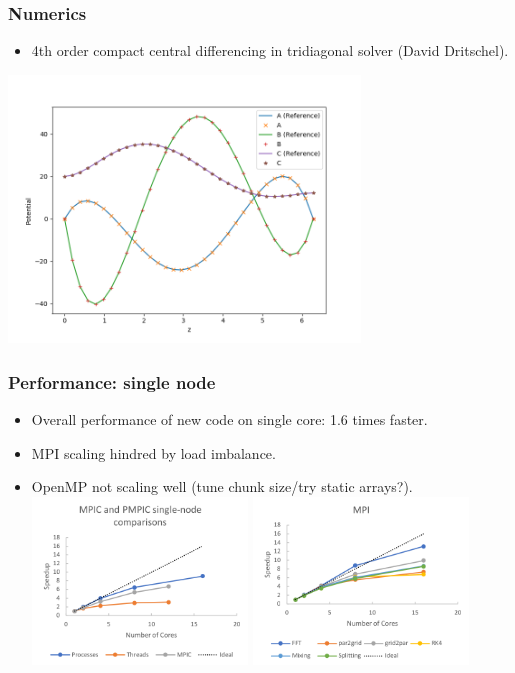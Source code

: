 \documentclass{beamer}
\begin{document}
\begin{frame}
\frametitle{Numerics}
\begin{itemize}
\item 4th order compact central differencing in tridiagonal solver (David Dritschel).
\end{itemize}

\includegraphics[width=0.70\textwidth]{pmpic_images/solution.png} 

\end{frame}

\begin{frame}
\frametitle{Performance: single node}

\begin{itemize}
\item Overall performance of new code on single core: 1.6 times faster.
\item MPI scaling hindred by load imbalance.
\item OpenMP not scaling well (tune chunk size/try static arrays?).
\includegraphics[width=0.45\textwidth]{pmpic_images/singleNode.png} 
\includegraphics[width=0.45\textwidth]{pmpic_images/MPISingle.png} 
\end{itemize}

\end{frame}
\end{document}
